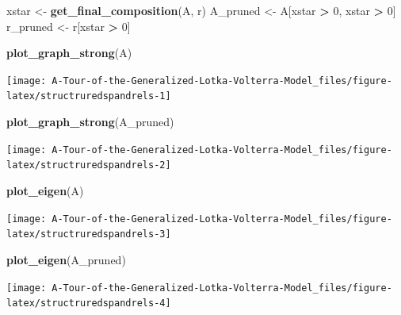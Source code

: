 \documentclass[
]{book}
\newenvironment{Shaded}{\begin{snugshade}}{\end{snugshade}}
\newcommand{\DecValTok}[1]{\textcolor[rgb]{0.00,0.00,0.81}{#1}}
\newcommand{\KeywordTok}[1]{\textcolor[rgb]{0.13,0.29,0.53}{\textbf{#1}}}
\newcommand{\NormalTok}[1]{#1}
\newcommand{\OperatorTok}[1]{\textcolor[rgb]{0.81,0.36,0.00}{\textbf{#1}}}
\newcommand{\StringTok}[1]{\textcolor[rgb]{0.31,0.60,0.02}{#1}}
\begin{document}
\begin{Shaded}
\begin{Highlighting}[]
\NormalTok{xstar <-}\StringTok{ }\KeywordTok{get_final_composition}\NormalTok{(A, r)}
\NormalTok{A_pruned <-}\StringTok{ }\NormalTok{A[xstar }\OperatorTok{>}\StringTok{ }\DecValTok{0}\NormalTok{, xstar }\OperatorTok{>}\StringTok{ }\DecValTok{0}\NormalTok{]}
\NormalTok{r_pruned <-}\StringTok{ }\NormalTok{r[xstar }\OperatorTok{>}\StringTok{ }\DecValTok{0}\NormalTok{]}

\KeywordTok{plot_graph_strong}\NormalTok{(A)}
\end{Highlighting}
\end{Shaded}

\begin{center}\texttt{[image: A-Tour-of-the-Generalized-Lotka-Volterra-Model\_files/figure-latex/structruredspandrels-1]} \end{center}

\begin{Shaded}
\begin{Highlighting}[]
\KeywordTok{plot_graph_strong}\NormalTok{(A_pruned)}
\end{Highlighting}
\end{Shaded}

\begin{center}\texttt{[image: A-Tour-of-the-Generalized-Lotka-Volterra-Model\_files/figure-latex/structruredspandrels-2]} \end{center}

\begin{Shaded}
\begin{Highlighting}[]
\KeywordTok{plot_eigen}\NormalTok{(A)}
\end{Highlighting}
\end{Shaded}

\begin{center}\texttt{[image: A-Tour-of-the-Generalized-Lotka-Volterra-Model\_files/figure-latex/structruredspandrels-3]} \end{center}

\begin{Shaded}
\begin{Highlighting}[]
\KeywordTok{plot_eigen}\NormalTok{(A_pruned)}
\end{Highlighting}
\end{Shaded}

\begin{center}\texttt{[image: A-Tour-of-the-Generalized-Lotka-Volterra-Model\_files/figure-latex/structruredspandrels-4]} \end{center}
\end{document}
